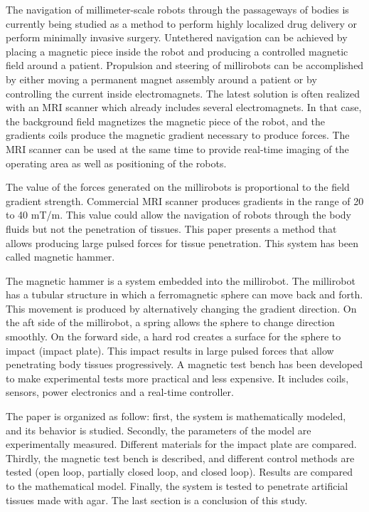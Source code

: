 \documentclass[letterpaper, 10 pt, conference]{ieeeconf}  %
\begin{document}
The navigation of millimeter-scale robots \cite{ahu61} through the passageways of bodies is currently being studied as a method to perform highly localized drug delivery or perform minimally invasive surgery. Untethered navigation can be achieved by placing a magnetic piece inside the robot and producing a controlled magnetic field around a patient. Propulsion and steering of millirobots can be accomplished by either moving a permanent magnet assembly around a patient or by controlling the current inside electromagnets. The latest solution is often realized with an MRI scanner which already includes several electromagnets. In that case, the background field magnetizes the magnetic piece of the robot, and the gradients coils produce the magnetic gradient necessary to produce forces. The MRI scanner can be used at the same time to provide real-time imaging of the operating area as well as positioning of the robots.\par
The value of the forces generated on the millirobots is proportional to the field gradient strength. Commercial MRI scanner produces gradients in the range of 20 to 40 mT/m. This value could allow the navigation of robots through the body fluids but not the penetration of tissues. This paper presents a method that allows producing large pulsed forces for tissue penetration. This system has been called magnetic hammer.\par
The magnetic hammer is a system embedded into the millirobot. The millirobot has a tubular structure in which a ferromagnetic sphere can move back and forth. This movement is produced by alternatively changing the gradient direction. On the aft side of the millirobot, a spring allows the sphere to change direction smoothly. On the forward side, a hard rod creates a surface for the sphere to impact (impact plate). This impact results in large pulsed forces that allow penetrating body tissues progressively.
A magnetic test bench has been developed to make experimental tests more practical and less expensive. It includes coils, sensors, power electronics and a real-time controller.\par
The paper is organized as follow: first, the system is mathematically modeled, and its behavior is studied. Secondly, the parameters of the model are experimentally measured. Different materials for the impact plate are compared. Thirdly, the magnetic test bench is described, and different control methods are tested (open loop, partially closed loop, and closed loop). Results are compared to the mathematical model. Finally, the system is tested to penetrate artificial tissues made with agar. The last section is a conclusion of this study.
\end{document}
